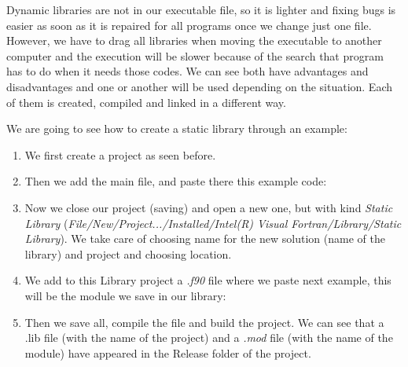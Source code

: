\begin{itemize}
    Dynamic libraries are not in our executable file, so it is lighter and fixing bugs is easier as soon as it is repaired for all programs once we change just one file. However, we have to drag all libraries when moving the executable to another computer and the execution will be slower because of the search that program has to do when it needs those codes. We can see both have advantages and disadvantages and one or another will be used depending on the situation. Each of them is created, compiled and linked in a different way.
    
    We are going to see how to create a static library through an example:
    
    \begin{enumerate}
        \item We first create a project as seen before.
        \item Then we add the main file, and paste there this example code:
        
            \vspace{0.5cm}
            
            
        \item Now we close our project (saving) and open a new one, but with kind \textit{Static Library} (\textit{File/New/Project.../Installed/Intel(R) Visual Fortran/Library/Static Library}). We take care of choosing name for the new solution (name of the library) and project and choosing location.
        \item We add to this Library project a \textit{.f90} file where we paste next example, this will be the module we save in our library:
            
            \newpage
            \vspace{0.5cm}
            
               
        \item Then we save all, compile the file and build the project. We can see that a .lib file (with the name of the project) and a \textit{.mod} file (with the name of the module) have appeared in the Release folder of the project.
        
            \vspace{0.5cm}
            
        

\end{enumerate}
\end{itemize}
